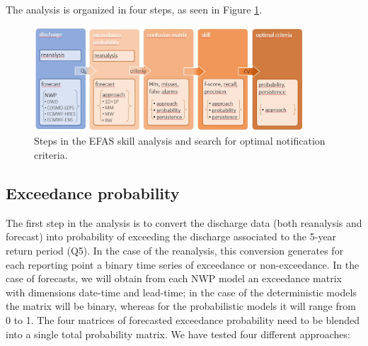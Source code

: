 \documentclass[preprint,12pt]{elsarticle}
\begin{document}
The analysis is organized in four steps, as seen in Figure \ref{fig:scheme}.

\begin{figure}
    \centering
    \includegraphics[width=0.9\textwidth]{figures/study_layout.JPG}
    \caption{Steps in the EFAS skill analysis and search for optimal notification criteria.}
    \label{fig:scheme}
\end{figure}

\subsection{Exceedance probability}

The first step in the analysis is to convert the discharge data (both reanalysis and forecast) into probability of exceeding the discharge associated to the 5-year return period (Q5). In the case of the reanalysis, this conversion generates for each reporting point a binary time series of exceedance or non-exceedance. In the case of forecasts, we will obtain from each NWP model an exceedance matrix with dimensions date-time and lead-time; in the case of the deterministic models the matrix will be binary, whereas for the probabilistic models it will range from 0 to 1. The four matrices of forecasted exceedance probability need to be blended into a single total probability matrix. We have tested four different approaches:
\end{document}
